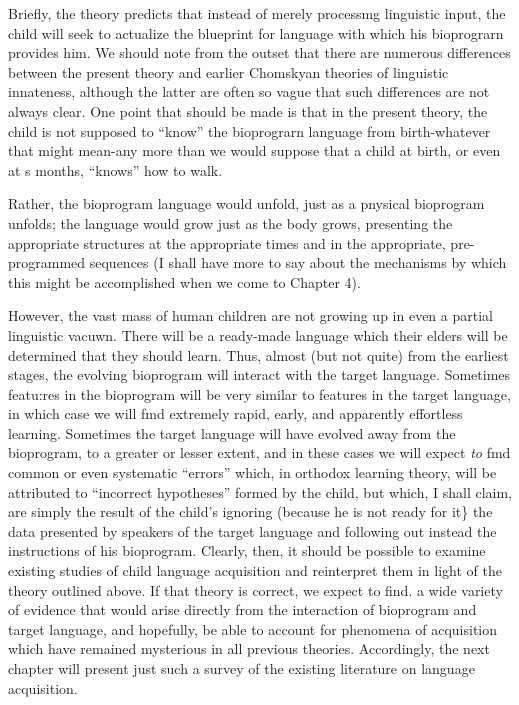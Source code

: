 Briefly, the theory predicts that instead of merely processmg
linguistic input, the child will seek to actualize the blueprint for lan\-guage with which his bioprograrn provides him. We should note from the outset that there are numerous differences between the present theory and earlier Chomskyan theories of linguistic innateness, al\-though the latter are often so vague that such differences are not always clear. One point that should be made is that in the present theory, the child is not supposed to ``know'' the bioprograrn language from birth-whatever that might mean-any more than we would suppose that a child at birth, or even at s months, ``knows'' how to walk.


Rather, the bioprogram language would unfold, just as a pnysical bioprogram unfolds; the language would grow just as the body grows, presenting the appropriate structures at the appropriate times and in the appropriate, pre-programmed sequences (I shall have more to say about the mechanisms by which this might be accomplished when we come to Chapter 4).

However, the vast mass of human children are not growing up in even a partial linguistic vacuwn. There will be a ready-made language which their elders will be determined that they should learn. Thus, almost (but not quite) from the earliest stages, the evolving bioprogram will interact with the target language. Sometimes featu:res in the bio\-program will be very similar to features in the target language, in which case we will fmd extremely rapid, early, and apparently effortless learning. Sometimes the target language will have evolved away from the bioprogram, to a greater or lesser extent, and in these cases we will expect \textit{to} fmd common or even systematic ``errors'' which, in orthodox learning theory, will be attributed to ``incorrect hypotheses'' formed by the child, but which, I shall claim, are simply the result of the child's ignoring (because he is not ready for it\} the data presented by speakers of the target language and following out instead the instruc\-tions of his bioprogram.
Clearly, then, it should be possible to examine existing studies of child language acquisition and reinterpret them in light of the theory outlined above. If that theory is correct, we expect to find. a wide variety of evidence that would arise directly from the interaction of bioprogram and target language, and hopefully, be able to account for phenomena of acquisition which have remained mysterious in all previous theories. Accordingly, the next chapter will present just such a survey of the existing literature on language acquisition.

